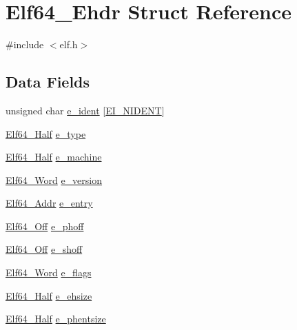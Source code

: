 \hypertarget{struct_elf64___ehdr}{\section{Elf64\-\_\-\-Ehdr Struct Reference}
\label{struct_elf64___ehdr}
}


{\ttfamily \#include $<$elf.\-h$>$}

\subsection*{Data Fields}
\begin{DoxyCompactItemize}
\item 
unsigned char \hyperlink{struct_elf64___ehdr_a989deb32d9be1514da87d64e8698600a}{e\-\_\-ident} \mbox{[}\hyperlink{elf_8h_ae407130db14180c6737390604ba7c1fe}{E\-I\-\_\-\-N\-I\-D\-E\-N\-T}\mbox{]}
\item 
\hyperlink{elf_8h_adb6a5584018b431da3472e7c6a7fd731}{Elf64\-\_\-\-Half} \hyperlink{struct_elf64___ehdr_a1d0b03fb2f1085bb3e078a0394e473bc}{e\-\_\-type}
\item 
\hyperlink{elf_8h_adb6a5584018b431da3472e7c6a7fd731}{Elf64\-\_\-\-Half} \hyperlink{struct_elf64___ehdr_a01538541f18c03e0ebfd8d396dc3b0eb}{e\-\_\-machine}
\item 
\hyperlink{elf_8h_aa3aa1920ed115b7ef7e99716fece4401}{Elf64\-\_\-\-Word} \hyperlink{struct_elf64___ehdr_af783d809d1f8907fb08e0f84f07894ab}{e\-\_\-version}
\item 
\hyperlink{elf_8h_aeed51d08e3a950d637f8ec1f0cd4ef65}{Elf64\-\_\-\-Addr} \hyperlink{struct_elf64___ehdr_a4098f902aafba5f23ad6d5506e540e2d}{e\-\_\-entry}
\item 
\hyperlink{elf_8h_a6f7837bc80df7a68291fce54ff088849}{Elf64\-\_\-\-Off} \hyperlink{struct_elf64___ehdr_aa444d044134e2fc9a9e361f0a8623063}{e\-\_\-phoff}
\item 
\hyperlink{elf_8h_a6f7837bc80df7a68291fce54ff088849}{Elf64\-\_\-\-Off} \hyperlink{struct_elf64___ehdr_a3c54b0a9a6679e31282496a396d171f2}{e\-\_\-shoff}
\item 
\hyperlink{elf_8h_aa3aa1920ed115b7ef7e99716fece4401}{Elf64\-\_\-\-Word} \hyperlink{struct_elf64___ehdr_a23ee84e40f0f22eb20daffa985c0cef0}{e\-\_\-flags}
\item 
\hyperlink{elf_8h_adb6a5584018b431da3472e7c6a7fd731}{Elf64\-\_\-\-Half} \hyperlink{struct_elf64___ehdr_a302628c79818430e012cb39ebe173eac}{e\-\_\-ehsize}
\item 
\hyperlink{elf_8h_adb6a5584018b431da3472e7c6a7fd731}{Elf64\-\_\-\-Half} \hyperlink{struct_elf64___ehdr_a5381f6c68941e0b6da34dc5612c43449}{e\-\_\-phentsize}

\end{DoxyCompactItemize}
